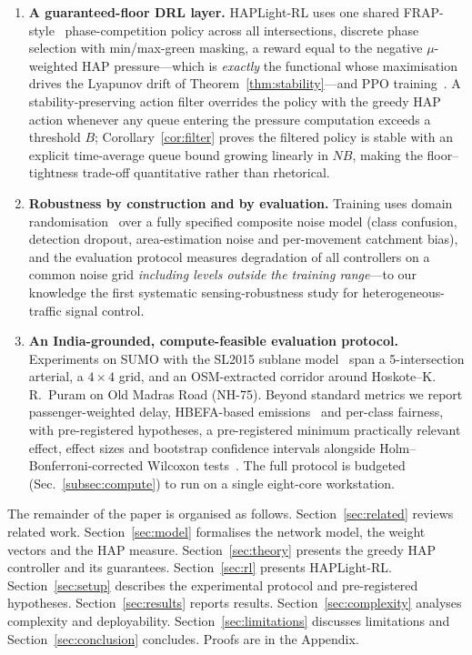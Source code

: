 \documentclass[journal]{IEEEtran}
\begin{document}
\begin{enumerate}
\item \textbf{A guaranteed-floor DRL layer.} HAPLight-RL uses one shared
      FRAP-style~\cite{b_frap} phase-competition policy across all
      intersections, discrete phase selection with min/max-green masking,
      a reward equal to the negative $\mu$-weighted HAP pressure---which
      is \emph{exactly} the functional whose maximisation drives the
      Lyapunov drift of Theorem~\ref{thm:stability}---and PPO
      training~\cite{b_ppo,b_mappo}. A stability-preserving action filter
      overrides the policy with the greedy HAP action whenever any queue
      entering the pressure computation exceeds a threshold $B$;
      Corollary~\ref{cor:filter} proves the filtered policy is stable
      with an explicit time-average queue bound growing linearly in
      $NB$, making the floor--tightness trade-off quantitative rather
      than rhetorical.
\item \textbf{Robustness by construction and by evaluation.} Training
      uses domain randomisation~\cite{b_tobin} over a fully specified
      composite noise model (class confusion, detection dropout,
      area-estimation noise and per-movement catchment bias), and the
      evaluation protocol measures degradation of all controllers on a
      common noise grid \emph{including levels outside the training
      range}---to our knowledge the first systematic sensing-robustness
      study for heterogeneous-traffic signal control.
\item \textbf{An India-grounded, compute-feasible evaluation protocol.}
      Experiments on SUMO with the SL2015 sublane model~\cite{b_sumo,%
      b_simtram} span a 5-intersection arterial, a $4\times4$ grid, and an
      OSM-extracted corridor around Hoskote--K.\,R.~Puram on Old Madras
      Road (NH-75). Beyond standard metrics we report passenger-weighted
      delay, HBEFA-based emissions~\cite{b_hbefa} and per-class fairness,
      with pre-registered hypotheses, a pre-registered minimum
      practically relevant effect, effect sizes and bootstrap confidence
      intervals alongside Holm--Bonferroni-corrected Wilcoxon
      tests~\cite{b_resco}. The full protocol is budgeted
      (Sec.~\ref{subsec:compute}) to run on a single eight-core
      workstation.
\end{enumerate}

The remainder of the paper is organised as follows.
Section~\ref{sec:related} reviews related work.
Section~\ref{sec:model} formalises the network model, the weight vectors
and the HAP measure. Section~\ref{sec:theory} presents the greedy HAP
controller and its guarantees. Section~\ref{sec:rl} presents HAPLight-RL.
Section~\ref{sec:setup} describes the experimental protocol and
pre-registered hypotheses. Section~\ref{sec:results} reports results.
Section~\ref{sec:complexity} analyses complexity and deployability.
Section~\ref{sec:limitations} discusses limitations and
Section~\ref{sec:conclusion} concludes. Proofs are in the Appendix.
\end{document}
